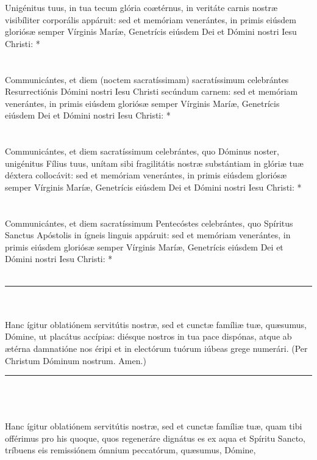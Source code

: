 \documentclass[12pt, a4paper]{article}
\begin{document}
	Unigénitus tuus, in tua tecum glória
	coætérnus, in veritáte carnis nostræ
	visibíliter corporális appáruit: sed et
	memóriam venerántes, in primis
	eiúsdem gloriósæ semper Vírginis
	Maríæ, Genetrícis eiúsdem Dei et
	Dómini nostri Iesu Christi: *
	\\\\
	\\
	Communicántes, et diem (noctem
	sacratíssimam) sacratíssimum
	celebrántes Resurrectiónis Dómini
	nostri Iesu Christi secúndum
	carnem: sed et memóriam
	venerántes, in primis eiúsdem
	gloriósæ semper Vírginis Maríæ,
	Genetrícis eiúsdem Dei et Dómini
	nostri Iesu Christi: *
	\\\\
	\\
	Communicántes, et diem
	sacratíssimum celebrántes, quo
	Dóminus noster, unigénitus Fílius
	tuus, unítam sibi fragilitátis nostræ
	substántiam in glóriæ tuæ déxtera
	collocávit: sed et memóriam
	venerántes, in primis eiúsdem
	gloriósæ semper Vírginis Maríæ,
	Genetrícis eiúsdem Dei et Dómini
	nostri Iesu Christi: *
	\\\\
	\\
	Communicántes, et diem
	sacratíssimum Pentecóstes
	celebrántes, quo Spíritus Sanctus
	Apóstolis in ígneis linguis appáruit:
	sed et memóriam venerántes, in
	primis eiúsdem gloriósæ semper
	Vírginis Maríæ, Genetrícis eiúsdem
	Dei et Dómini nostri Iesu Christi: *
	\\\\
	\noindent\rule{10cm}{0.4pt}
	\\\\
	Hanc ígitur oblatiónem servitútis
	nostræ, sed et cunctæ famíliæ tuæ,
	quæsumus, Dómine, ut placátus
	accípias: diésque nostros in tua
	pace dispónas, atque ab ætérna
	damnatióne nos éripi et in
	electórum tuórum iúbeas grege
	numerári. (Per Christum Dóminum
	nostrum. Amen.)
	\\
	\noindent\rule{10cm}{0.4pt}
	\\\\
	\\
	Hanc ígitur oblatiónem servitútis
	nostræ, sed et cunctæ famíliæ tuæ,
	quam tibi offérimus pro his
	quoque, quos regeneráre dignátus
	es ex aqua et Spíritu Sancto,
	tríbuens eis remissiónem ómnium
	peccatórum, quæsumus, Dómine,
\end{document}

